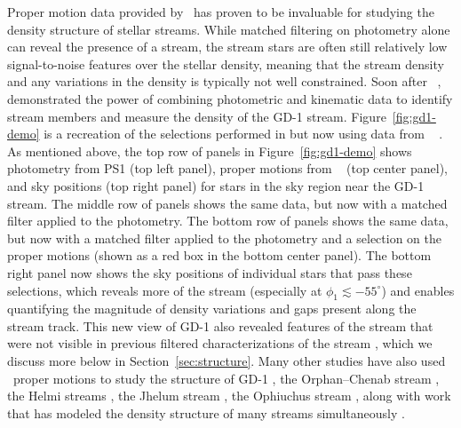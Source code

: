 \documentclass[final,5p,times,twocolumn,authoryear]{elsarticle}
\begin{document}
Proper motion data provided by \gaia\ has proven to be invaluable for studying the
density structure of stellar streams.
While matched filtering on photometry alone can reveal the presence of a stream, the
stream stars are often still relatively low signal-to-noise features over the 
stellar density, meaning that the stream density and any variations in the density is
typically not well constrained.
Soon after \gaia\ , \citet{price-whelan:2018} demonstrated the power of combining
photometric and kinematic data to identify stream members and measure the density of the
GD-1 stream.
Figure~\ref{fig:gd1-demo} is a recreation of the selections performed in
\citet{price-whelan:2018} but now using data from \gaia\  \citep{gaiadr3}.
As mentioned above, the top row of panels in Figure~\ref{fig:gd1-demo} shows photometry
from PS1 (top left panel), proper motions from \gaia\  (top center panel), and sky
positions (top right panel) for stars in the sky region near the GD-1 stream.
The middle row of panels shows the same data, but now with a matched filter applied to
the photometry.
The bottom row of panels shows the same data, but now with a matched filter applied to
the photometry and a selection on the proper motions (shown as a red box in the bottom
center panel).
The bottom right panel now shows the sky positions of individual stars that pass these
selections, which reveals more of the stream (especially at $\phi_1 \lesssim -55^\circ$)
and enables quantifying the magnitude of density variations and gaps present along the
stream track.
This new view of GD-1 also revealed features of the stream that were not visible in
previous filtered characterizations of the stream \citep{grillmair:2006-gd1,
koposov:2010, deboer:2018}, which we discuss more below in Section~\ref{sec:structure}.
Many other studies have also used \gaia\ proper motions to study the structure of GD-1
\citep[e.g.,][]{malhan:2018, li-yanny:2018, huang:2019, deboer:2020, ibata:2020}, the
Orphan--Chenab stream \citep{koposov:2019}, the Helmi streams \citep{koppelman:2019},
the Jhelum stream \citep{bonaca:2019}, the Ophiuchus stream \citep{caldwell:2020}, along
with work that has modeled the density structure of many streams simultaneously
\citep[e.g.,][]{patrick:2022}.
\end{document}
